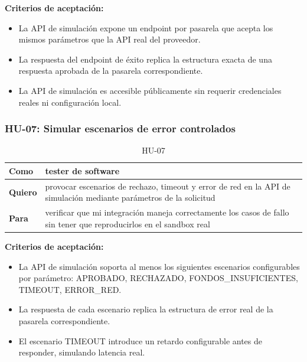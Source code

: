 \documentclass[10pt]{article}
\begin{document}
\textbf{Criterios de aceptación:}
\begin{itemize}
  \item La API de simulación expone un endpoint por pasarela que acepta los mismos parámetros que la API real del proveedor.
  \item La respuesta del endpoint de éxito replica la estructura exacta de una respuesta aprobada de la pasarela correspondiente.
  \item La API de simulación es accesible públicamente sin requerir credenciales reales ni configuración local.
\end{itemize}

\subsubsection{HU-07: Simular escenarios de error controlados}
\begin{table}[htbp]
  \centering
  \renewcommand{\arraystretch}{1.2}
  \begin{tabularx}{\textwidth}{|l|X|}
    \hline
    \textbf{Como} & tester de software \\
    \hline
    \textbf{Quiero} & provocar escenarios de rechazo, timeout y error de red en la API de simulación mediante parámetros de la solicitud \\
    \hline
    \textbf{Para} & verificar que mi integración maneja correctamente los casos de fallo sin tener que reproducirlos en el sandbox real \\
    \hline
  \end{tabularx}
  \caption{HU-07}
  \label{tab:hu-07}
\end{table}

\textbf{Criterios de aceptación:}
\begin{itemize}
  \item La API de simulación soporta al menos los siguientes escenarios configurables por parámetro: APROBADO, RECHAZADO, FONDOS\_INSUFICIENTES, TIMEOUT, ERROR\_RED.
  \item La respuesta de cada escenario replica la estructura de error real de la pasarela correspondiente.
  \item El escenario TIMEOUT introduce un retardo configurable antes de responder, simulando latencia real.
\end{itemize}
\end{document}
